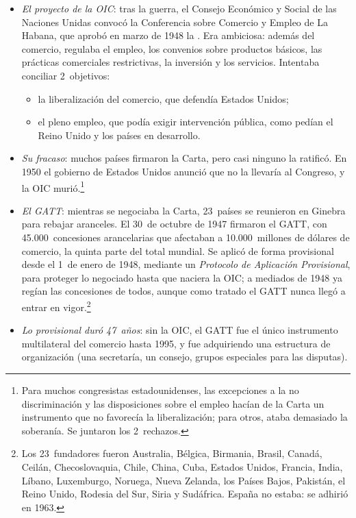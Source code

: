 \documentclass[11pt]{article}
\begin{document}
\begin{itemize}
\item \emph{El proyecto de la OIC}: tras la guerra, el Consejo Económico y Social de las Naciones Unidas convocó la Conferencia sobre Comercio y Empleo de La Habana, que aprobó en marzo de 1948 la . Era ambiciosa: además del comercio, regulaba el empleo, los convenios sobre productos básicos, las prácticas comerciales restrictivas, la inversión y los servicios. Intentaba conciliar 2~objetivos:
  \begin{itemize}
  \item la liberalización del comercio, que defendía Estados Unidos;
  \item el pleno empleo, que podía exigir intervención pública, como pedían el Reino Unido y los países en desarrollo.
  \end{itemize}
\item \emph{Su fracaso}: muchos países firmaron la Carta, pero casi ninguno la ratificó. En 1950 el gobierno de Estados Unidos anunció que no la llevaría al Congreso, y la OIC murió\nocite{OMC2026AniosGATT}.\footnote{Para muchos congresistas estadounidenses, las excepciones a la no discriminación y las disposiciones sobre el empleo hacían de la Carta un instrumento que no favorecía la liberalización; para otros, ataba demasiado la soberanía. Se juntaron los 2~rechazos.}
\item \emph{El GATT}: mientras se negociaba la Carta, 23~países se reunieron en Ginebra para rebajar aranceles. El 30~de octubre de 1947 firmaron el GATT, con 45.000~concesiones arancelarias que afectaban a 10.000~millones de dólares de comercio, la quinta parte del total mundial. Se aplicó de forma provisional desde el 1~de enero de 1948, mediante un \emph{Protocolo de Aplicación Provisional}, para proteger lo negociado hasta que naciera la OIC; a mediados de 1948 ya regían las concesiones de todos, aunque como tratado el GATT nunca llegó a entrar en vigor\nocite{OMC2026AniosGATT,OMC2026IndiceGATT}.\footnote{Los 23~fundadores fueron Australia, Bélgica, Birmania, Brasil, Canadá, Ceilán, Checoslovaquia, Chile, China, Cuba, Estados Unidos, Francia, India, Líbano, Luxemburgo, Noruega, Nueva Zelanda, los Países Bajos, Pakistán, el Reino Unido, Rodesia del Sur, Siria y Sudáfrica. España no estaba: se adhirió en 1963.}
\item \emph{Lo provisional duró 47~años}: sin la OIC, el GATT fue el único instrumento multilateral del comercio hasta 1995, y fue adquiriendo una estructura de organización (una secretaría, un consejo, grupos especiales para las disputas).
\end{itemize}
\end{document}
